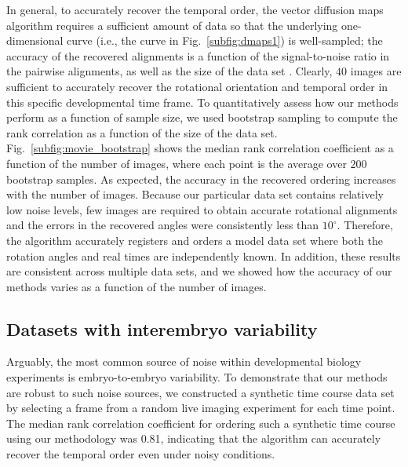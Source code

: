\documentclass{pnastwo}
\newcommand{\fig}[0]{Fig.}
\begin{document}
\begin{article}
In general, to accurately recover the temporal order, the vector diffusion maps algorithm requires a sufficient amount of data so that the underlying one-dimensional curve (i.e., the curve in \fig~\ref{subfig:dmaps1}) is well-sampled;
the accuracy of the recovered alignments is a function of the signal-to-noise ratio in the pairwise alignments, as well as the size of the data set \cite{singer2011angular}.
%
Clearly, $40$ images are sufficient to accurately recover the rotational orientation and temporal order  in this specific developmental time frame.
%
To quantitatively assess how our methods perform as a function of sample size, we used bootstrap sampling to compute the rank correlation as a function of the size of the data set.
%
\fig~\ref{subfig:movie_bootstrap} shows the median rank correlation coefficient as a function of the number of images, where each point is the average over $200$ bootstrap samples.
%
As expected, the accuracy in the recovered ordering increases with the number of images. 
%
Because our particular data set contains relatively low noise levels, few images are required to obtain accurate rotational alignments and the errors in the recovered angles were consistently less than $10^{\circ}$.
%
Therefore, the algorithm accurately registers and orders a model data set where both the rotation angles and real times are independently known. 
%
In addition, these results are consistent across multiple data sets, and we showed how the accuracy of our methods varies as a function of the number of images.


\subsection{Datasets with interembryo variability}

Arguably, the most common source of noise within developmental biology experiments is embryo-to-embryo variability. 
%
To demonstrate that our methods are robust to such noise sources,
we constructed a synthetic time course data set by selecting a frame from a random live imaging experiment for each time point.
%
The median rank correlation coefficient for ordering such a synthetic time course using our methodology was 0.81, indicating that the algorithm can accurately recover the temporal order even under noisy conditions. 


\end{article}
\end{document}
